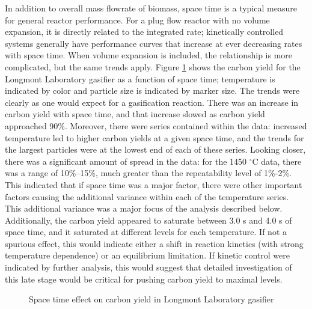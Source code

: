 \documentclass[11pt,twocolumn]{article}
\begin{document}
In addition to overall mass flowrate of biomass, space time is a typical measure for general reactor performance.  For a plug flow reactor with no volume expansion, it is directly related to the integrated rate; kinetically controlled systems generally have performance curves that increase at ever decreasing rates with space time.  When volume expansion is included, the relationship is more complicated, but the same trends apply.  Figure \ref{fig-Lab-Xg-tau} shows the carbon yield for the Longmont Laboratory gasifier as a function of space time; temperature is indicated by color and particle size is indicated by marker size.  The trends were clearly as one would expect for a gasification reaction.  There was an increase in carbon yield with space time, and that increase slowed as carbon yield approached 90\%.  Moreover, there were series contained within the data: increased temperature led to higher carbon yields at a given space time, and the trends for the largest particles were at the lowest end of each of these series.  Looking closer, there was a significant amount of spread in the data: for the 1450 $^{\circ}$C data, there was a range of 10\%--15\%, much greater than the repeatability level of 1\%-2\%.  This indicated that if space time was a major factor, there were other important factors causing the additional variance within each of the temperature series.  This additional variance was a major focus of the analysis described below.  Additionally, the carbon yield appeared to saturate between 3.0 s and 4.0 s of space time, and it saturated at different levels for each temperature.  If not a spurious effect, this would indicate either a shift in reaction kinetics (with strong temperature dependence) or an equilibrium limitation.  If kinetic control were indicated by further analysis, this would suggest that detailed investigation of this late stage would be critical for pushing carbon yield to maximal levels. 

\begin{figure}[hp]

\caption{Space time effect on carbon yield in Longmont Laboratory gasifier}
\label{fig-Lab-Xg-tau}
\end{figure}
\end{document}
